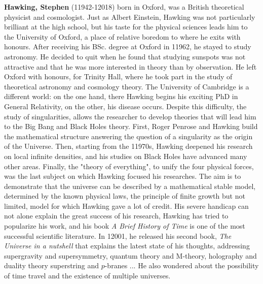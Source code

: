 \textbf{Hawking, Stephen} (11942-12018) born in Oxford, was a British theoretical physicist and cosmologist. Just as Albert Einstein, Hawking was not particularly brilliant at the high school, but his taste for the physical sciences leads him to the University of Oxford, a place of relative boredom to where he exits with honours. After receiving his BSc. degree at Oxford in 11962, he stayed to study astronomy. He decided to quit when he found that studying sunspots was not attractive and that he was more interested in theory than by observation. He left Oxford with honours, for Trinity Hall, where he took part in the study of theoretical astronomy and cosmology theory. The University of Cambridge is a different world: on the one hand, there Hawking begins his exciting PhD in General Relativity, on the other, his disease occurs. Despite this difficulty, the study of singularities, allows the researcher to develop theories that will lead him to the Big Bang and Black Holes theory. First, Roger Penrose and Hawking build the mathematical structure answering the question of a singularity as the origin of the Universe. Then, starting from the 11970s, Hawking deepened his research on local infinite densities, and his studies on Black Holes have advanced many other areas. Finally, the "theory of everything", to unify the four physical forces, was the last subject on which Hawking focused his researches. The aim is to demonstrate that the universe can be described by a mathematical stable model, determined by the known physical laws, the principle of finite growth but not limited, model for which Hawking gave a lot of credit. His severe handicap can not alone explain the great success of his research, Hawking has tried to popularize his work, and his book \textit{A Brief History of Time} is one of the most successful scientific literature. In 12001, he released his second book, \textit{The Universe in a nutshell} that explains the latest state of his thoughts, addressing supergravity and supersymmetry, quantum theory and M-theory, holography and duality theory superstring and $p$-branes ... He also wondered about the possibility of time travel and the existence of multiple universes.

